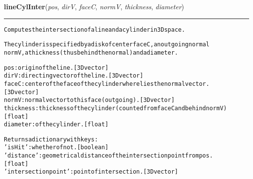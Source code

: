 \hspace{.8\funcindent}\begin{boxedminipage}{\funcwidth}

    \raggedright \textbf{lineCylInter}(\textit{pos}, \textit{dirV}, \textit{faceC}, \textit{normV}, \textit{thickness}, \textit{diameter})

    \vspace{-1.5ex}

    \rule{\textwidth}{0.5\fboxrule}
\setlength{\parskip}{2ex}
\begin{alltt}
Computes the intersection of a line and a cylinder in 3D space.

The cylinder is specified by a disk of center faceC, an outgoing normal
normV, a thickness (thus behind the normal) and a diameter.

pos: origin of the line. [3D vector]
dirV: directing vector of the line. [3D vector]
faceC: center of the face of the cylinder where lies the normal vector.
    [3D vector]
normV: normal vector to this face (outgoing). [3D vector]
thickness: thickness of the cylinder (counted from faceC and behind normV)
    [float]
diameter: of the cylinder. [float]

Returns a dictionary with keys:
    'isHit': whether of not. [boolean]
    'distance': geometrical distance of the intersection point from pos.
        [float]
    'intersection point': point of intersection. [3D vector]
\end{alltt}

\setlength{\parskip}{1ex}
    \end{boxedminipage}

    \label{theia:helpers:geometry:newDir}

    \vspace{0.5ex}

